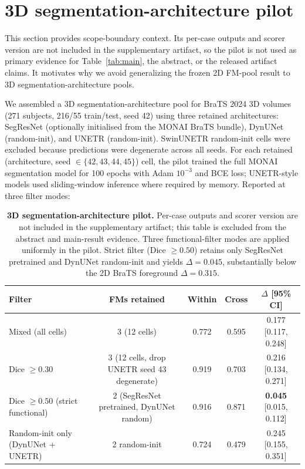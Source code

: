 \section{3D segmentation-architecture pilot}
\label{app:3dfm}
This section provides scope-boundary context. Its per-case outputs and scorer version are not included in the supplementary artifact, so the pilot is not used as primary evidence for Table~\ref{tab:main}, the abstract, or the released artifact claims. It motivates why we avoid generalizing the frozen 2D FM-pool result to 3D segmentation-architecture pools.

We assembled a 3D segmentation-architecture pool for BraTS 2024 3D volumes (271 subjects, 216/55 train/test, seed 42) using three retained architectures: SegResNet (optionally initialised from the MONAI BraTS bundle), DynUNet (random-init), and UNETR (random-init). SwinUNETR random-init cells were excluded because predictions were degenerate across all seeds. For each retained (architecture, seed $\in\{42,43,44,45\}$) cell, the pilot trained the full MONAI segmentation model for 100 epochs with Adam $10^{-3}$ and BCE loss; UNETR-style models used sliding-window inference where required by memory. Reported at three filter modes:

\begin{table}[!htbp]
  \caption{\textbf{3D segmentation-architecture pilot.} Per-case outputs and scorer version are not included in the supplementary artifact; this table is excluded from the abstract and main-result evidence. Three functional-filter modes are applied uniformly in the pilot. Strict filter (Dice $\geq 0.50$) retains only SegResNet pretrained and DynUNet random-init and yields $\Delta{=}0.045$, substantially below the 2D BraTS foreground $\Delta{=}0.315$.}
  \label{tab:3dfm}
  \centering\scriptsize
  \setlength{\tabcolsep}{3pt}
  \begin{tabularx}{\linewidth}{Ycccc}
    \toprule
    Filter & FMs retained & Within & Cross & $\Delta$ [95\% CI] \\
    \midrule
    Mixed (all cells)              & 3 (12 cells) & 0.772 & 0.595 & 0.177 [0.117, 0.248] \\
    Dice $\geq 0.30$                & 3 (12 cells, drop UNETR seed 43 degenerate) & 0.919 & 0.703 & 0.216 [0.134, 0.271] \\
    Dice $\geq 0.50$ (strict functional) & 2 (SegResNet pretrained, DynUNet random) & 0.916 & 0.871 & \textbf{0.045} [0.015, 0.112] \\
    \addlinespace
    Random-init only (DynUNet + UNETR) & 2 random-init & 0.724 & 0.479 & 0.245 [0.155, 0.351] \\
    \bottomrule
  \end{tabularx}
\end{table}

